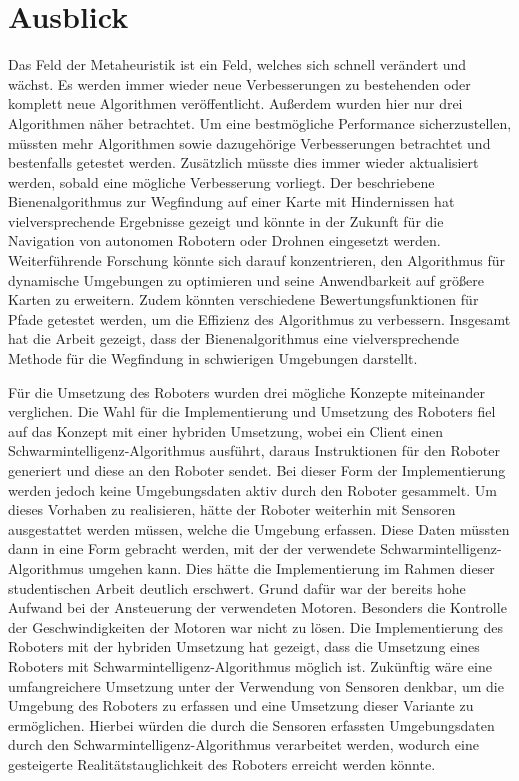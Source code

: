 \label{ch:fazit}
\section{Ausblick}
Das Feld der Metaheuristik ist ein Feld, welches sich schnell verändert und wächst. Es werden immer wieder neue Verbesserungen zu bestehenden oder komplett neue Algorithmen veröffentlicht. Außerdem wurden hier nur drei Algorithmen näher betrachtet. Um eine bestmögliche Performance sicherzustellen, müssten mehr Algorithmen sowie dazugehörige Verbesserungen betrachtet und bestenfalls getestet werden. Zusätzlich müsste dies immer wieder aktualisiert werden, sobald eine mögliche Verbesserung vorliegt.
Der beschriebene Bienenalgorithmus zur Wegfindung auf einer Karte mit Hindernissen hat vielversprechende Ergebnisse gezeigt und könnte in der Zukunft für die Navigation von autonomen Robotern oder Drohnen eingesetzt werden. Weiterführende Forschung könnte sich darauf konzentrieren, den Algorithmus für dynamische Umgebungen zu optimieren und seine Anwendbarkeit auf größere Karten zu erweitern. Zudem könnten verschiedene Bewertungsfunktionen für Pfade getestet werden, um die Effizienz des Algorithmus zu verbessern. Insgesamt hat die Arbeit gezeigt, dass der Bienenalgorithmus eine vielversprechende Methode für die Wegfindung in schwierigen Umgebungen darstellt.

Für die Umsetzung des Roboters wurden drei mögliche Konzepte miteinander verglichen. Die Wahl für die Implementierung und Umsetzung des Roboters fiel auf das Konzept mit einer hybriden Umsetzung, wobei ein Client einen Schwarmintelligenz-Algorithmus ausführt, daraus Instruktionen für den Roboter generiert und diese an den Roboter sendet. Bei dieser Form der Implementierung werden jedoch keine Umgebungsdaten aktiv durch den Roboter gesammelt. Um dieses Vorhaben zu realisieren, hätte der Roboter weiterhin mit Sensoren ausgestattet werden müssen, welche die Umgebung erfassen. Diese Daten müssten dann in eine Form gebracht werden, mit der der verwendete Schwarmintelligenz-Algorithmus umgehen kann. Dies hätte die Implementierung im Rahmen dieser studentischen Arbeit deutlich erschwert. Grund dafür war der bereits hohe Aufwand bei der Ansteuerung der verwendeten Motoren. Besonders die Kontrolle der Geschwindigkeiten der Motoren war nicht zu lösen. Die Implementierung des Roboters mit der hybriden Umsetzung hat gezeigt, dass die Umsetzung eines Roboters mit Schwarmintelligenz-Algorithmus möglich ist. Zukünftig wäre eine umfangreichere Umsetzung unter der Verwendung von Sensoren denkbar, um die Umgebung des Roboters zu erfassen und eine Umsetzung dieser Variante zu ermöglichen. Hierbei würden die durch die Sensoren erfassten Umgebungsdaten durch den Schwarmintelligenz-Algorithmus verarbeitet werden, wodurch eine gesteigerte Realitätstauglichkeit des Roboters erreicht werden könnte.